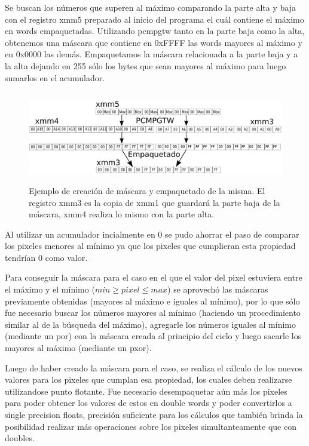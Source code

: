 Se buscan los números que superen al máximo comparando la parte alta y baja con el registro xmm5 preparado al inicio del programa el cuál contiene el máximo en words empaquetadas. Utilizando pcmpgtw tanto en la parte baja como la alta, obtenemos una máscara que contiene en 0xFFFF las words mayores al máximo y en 0x0000 las demás. Empaquetamos la máscara relacionada a la parte baja y a la alta dejando en 255 sólo los bytes que sean mayores al máximo para luego sumarlos en el acumulador.


\begin{figure}[H]
\centering
\includegraphics[width=150mm, height=40mm]{cpmmax.png}
\caption{Ejemplo de creación de máscara y empaquetado de la misma. El registro xmm3 es la copia de xmm1 que guardará la parte baja de la máscara, xmm4 realiza lo mismo con la parte alta.}
\label{overflow}
\end{figure}

Al utilizar un acumulador incialmente en 0 se pudo ahorrar el paso de comparar los pixeles menores al mínimo ya que los pixeles que cumplieran esta propiedad tendrían 0 como valor.

Para conseguir la máscara para el caso en el que el valor del pixel estuviera entre el máximo y el mínimo ($min \geq pixel \leq max$) se aprovechó las máscaras previamente obtenidas (mayores al máximo e iguales al mínimo), por lo que sólo fue necesario buscar los números mayores al mínimo (haciendo un procedimiento similar al de la búsqueda del máximo), agregarle los números iguales al mínimo (mediante un por) con la máscara creada al principio del ciclo y luego sacarle los mayores al máximo (mediante un pxor).

Luego de haber creado la máscara para el caso, se realiza el cálculo de los nuevos valores para los pixeles que cumplan esa propiedad, los cuales deben realizarse utilizandose punto flotante. Fue necesario desempaquetar aún más los pixeles para poder obtener los valores de estos en double words y poder convertirlos a single precision floats, precisión suficiente para los cálculos que también brinda la posibilidad realizar más operaciones sobre los pixeles simultanteamente que con doubles.


